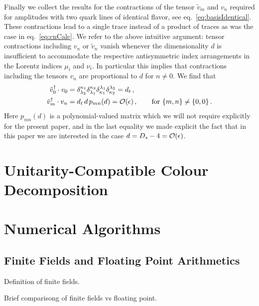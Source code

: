Finally we collect the results for the contractions of the 
tensor $\tilde v_m$ and $v_n$ required for amplitudes with two
quark lines of identical flavor,
see eq.~\eqref{eq:basisIdentical}.
These contractions lead to a single trace instead of a product 
of traces as was the case in eq.~\eqref{eq:cnCalc}.
We refer to the above intuitive argument: tensor 
contractions including $v_n$ or $\tilde v_n$ vanish 
whenever the dimensionality $d$ is insufficient to accommodate
the respective antisymmetric index arrangements in the Lorentz 
indices $\mu_i$ and $\nu_i$.
In particular this implies that contractions including the
tensors $v_{n}$ are proportional to $d$ for $n\neq0$. We find
that 
\begin{align}
  \begin{split}
    \tilde v_0^\dagger \cdot v_0 &=
    \delta^{\kappa_1}_{\lambda_2} \delta^{\kappa_2}_{\lambda_1}
    \delta_{\kappa_1}^{\lambda_1} \delta_{\kappa_2}^{\lambda_2} 
    = d_t \,, \\
    \tilde v_m^\dagger \cdot v_{n} &=d_t\,d\,p_{mn}(d) = 
    {\cal O}(\epsilon)\,,\qquad\textrm{for }\{m,n\}\neq\{0,0\}\,.
  \end{split}
\end{align}
Here $p_{mn}(d)$ is a polynomial-valued matrix which we 
will not require explicitly for the present paper, and in the
last equality we made explicit the fact that in this paper we 
are interested in the case $d=D_s-4={\cal O}(\epsilon)$.



\chapter{Unitarity-Compatible Colour Decomposition}


\chapter{Numerical Algorithms}

\section{Finite Fields and Floating Point Arithmetics}

Definition of finite fields.

Brief comparisong of finite fields vs floating point.

